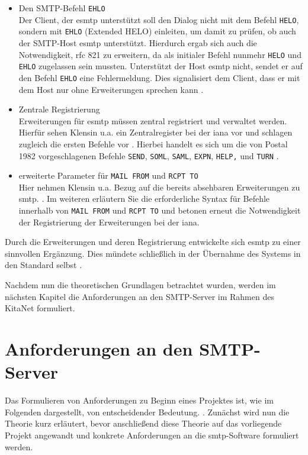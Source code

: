 \begin{itemize}
	\item{Den SMTP-Befehl \verb+EHLO+}\\
	Der Client, der \ac{esmtp} unterstützt soll den Dialog nicht mit dem Befehl \verb+HELO+, sondern mit \verb+EHLO+ (Extended HELO) einleiten, um damit zu prüfen, ob auch der SMTP-Host \ac{esmtp} unterstützt. Hierdurch ergab sich auch die Notwendigkeit, \ac{rfc} 821 zu erweitern, da als initialer Befehl nunmehr \verb+HELO+ und \verb+EHLO+ zugelassen sein mussten. Unterstützt der Host \ac{esmtp} nicht, sendet er auf den Befehl \verb+EHLO+ eine Fehlermeldung. Dies signalisiert dem Client, dass er mit dem Host nur ohne Erweiterungen sprechen kann \citep[vgl.][S. 3 ff.]{rfc1869}.
	\item{Zentrale Registrierung}\\
	Erweiterungen für \ac{esmtp} müssen zentral registriert und verwaltet werden. Hierfür sehen Klensin u.a. ein Zentralregister bei der \ac{iana} vor und schlagen zugleich die ersten Befehle vor \citep[vgl.][7]{rfc1869}. Hierbei handelt es sich um die von Postal 1982 vorgeschlagenen Befehle \verb+SEND+, \verb+SOML+, \verb+SAML+, \verb+EXPN+, \verb+HELP,+ und \verb+TURN+ \citep[für die Befehle vgl.][S. 23 ff.]{rfc821}.
	\item{erweiterte Parameter für \verb+MAIL FROM+ und \verb+RCPT TO+}\\
	Hier nehmen Klensin u.a. Bezug auf die bereits absehbaren Erweiterungen zu \ac{smtp}.  \citep[][7]{rfc1869}. Im weiteren erläutern Sie die erforderliche Syntax für Befehle innerhalb von \verb+MAIL FROM+ und \verb+RCPT TO+ und betonen erneut die Notwendigkeit der Registrierung der Erweiterungen bei der \ac{iana}.
\end{itemize}

Durch die Erweiterungen und deren Registrierung entwickelte sich \ac{esmtp} zu einer sinnvollen Ergänzung. Dies mündete schließlich in der Übernahme des Systems in den Standard selbst \citep[vgl. u.a.][S. 7 ff]{rfc2821}.

Nachdem nun die theoretischen Grundlagen betrachtet wurden, werden im nächsten Kapitel die Anforderungen an den SMTP-Server im Rahmen des KitaNet formuliert. 





\chapter{Anforderungen an den SMTP-Server}
\label{sec:Anforderung}
Das Formulieren von Anforderungen zu Beginn eines Projektes ist, wie im Folgenden dargestellt, von entscheidender Bedeutung.  \citep[][77]{Hull2010}. Zunächst wird nun die Theorie kurz erläutert, bevor anschließend diese Theorie auf das vorliegende Projekt angewandt und konkrete Anforderungen an die \ac{smtp}-Software formuliert werden.

